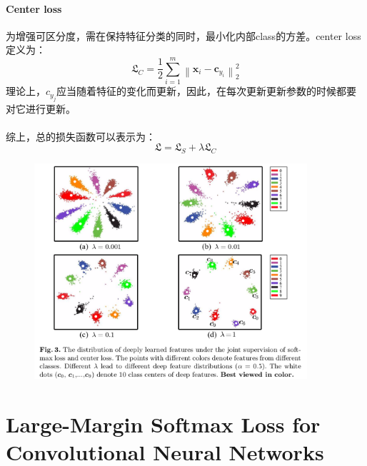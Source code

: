 \documentclass[10pt,letterpaper]{article}
\begin{document}
\paragraph{Center loss} 为增强可区分度，需在保持特征分类的同时，最小化内部class的方差。center loss定义为：
\begin{equation}
	\mathfrak{L}_C=\frac{1}{2}\sum^m_{i=1}\left \| \mathbf{x}_i-\mathbf{c}_{y_i} \right \|^2_2
\end{equation}
理论上，$c_{y_j}$应当随着特征的变化而更新，因此，在每次更新更新参数的时候都要对它进行更新。
\paragraph{} 综上，总的损失函数可以表示为：
\begin{equation}
	\mathfrak{L} = \mathfrak{L}_S + \lambda \mathfrak{L}_C
\end{equation}
\begin{figure}[H]
	\centering
	\includegraphics[width=0.9\textwidth]{../images/center-loss.png}
	\caption{}
	\label{softmax-loss-2-d}
\end{figure}


\newpage
\section{Large-Margin Softmax Loss for Convolutional Neural Networks\cite{l-softmax}}
\end{document}
